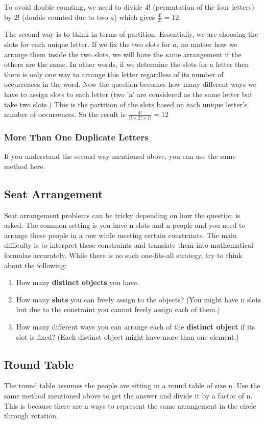 \documentclass[11pt]{article}
\begin{document}
To avoid double counting, we need to divide $4!$ (permutation of the four letters) by $2!$ (double counted due to two $a$) which gives $\frac{4!}{2!} = 12$.

The second way is to think in terms of partition. Essentially, we are choosing the slots for each unique letter. 
If we fix the two slots for $a$, no matter how we arrange them inside the two slots, we will have the same arrangement if the others are the same.
In other words, if we determine the slots for a letter then there is only one way to arrange this letter regardless of its number of occurrences in the word. 
Now the question becomes how many different ways we have to assign slots to each letter (two 'a' are considered as the same letter but take two slots.)
This is the partition of the slots based on each unique letter's number of occurrences. So the result is $\frac{4!}{1! \times 2! \times 1!} = 12$ 

\subsubsection{More Than One Duplicate Letters}
If you understand the second way mentioned above, you can use the same method here.

\subsection{Seat Arrangement}
Seat arrangement problems can be tricky depending on how the question is asked. The common setting is you have n slots and n people and you need to arrange these people in a row while meeting certain constraints.
The main difficulty is to interpret these constraints and translate them into mathematical formulas accurately. 
While there is no such one-fits-all strategy, try to think about the following:
\begin{enumerate}
  \item How many \textbf{distinct objects} you have.
  \item How many \textbf{slots} you can freely assign to the objects? (You might have n slots but due to the constraint you cannot freely assign each of them.)
  \item How many different ways you can arrange each of the \textbf{distinct object} if its slot is fixed? (Each distinct object might have more than one element.)
\end{enumerate}

\subsection{Round Table}
The round table assumes the people are sitting in a round table of size n. Use the same method mentioned above to get the answer and divide it by a factor of n.
This is because there are n ways to represent the same arrangement in the circle through rotation. 
\end{document}
